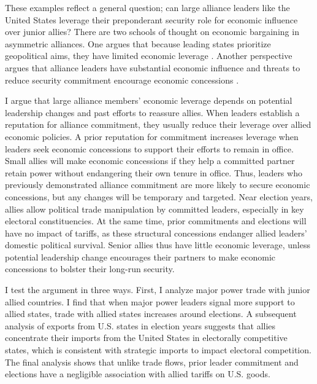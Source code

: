 \documentclass[12pt]{article}
\begin{document}
These examples reflect a general question; can large alliance leaders like the United States leverage their preponderant security role for economic influence over junior allies? 
There are two schools of thought on economic bargaining in asymmetric alliances. 
One argues that because leading states prioritize geopolitical aims, they have limited economic leverage \citep{Drezner2013, WolfordKim2017}.
Another perspective argues that alliance leaders have substantial economic influence \cite{Norrlof2010, Brooksetal2013} and threats to reduce security commitment encourage economic concessions \citep[pg. 122]{Oatley2015}. 


I argue that large alliance members' economic leverage depends on potential leadership changes and past efforts to reassure allies.
When leaders establish a reputation for alliance commitment, they usually reduce their leverage over allied economic policies. 
A prior reputation for commitment increases leverage when leaders seek economic concessions to support their efforts to remain in office. 
Small allies will make economic concessions if they help a committed partner retain power without endangering their own tenure in office.  
Thus, leaders who previously demonstrated alliance commitment are more likely to secure economic concessions, but any changes will be temporary and targeted.
Near election years, allies allow political trade manipulation by committed leaders, especially in key electoral constituencies. 
At the same time, prior commitments and elections will have no impact of tariffs, as these structural concessions endanger allied leaders' domestic political survival. 
Senior allies thus have little economic leverage, unless potential leadership change encourages their partners to make economic concessions to bolster their long-run security. 


I test the argument in three ways.
First, I analyze major power trade with junior allied countries. 
I find that when major power leaders signal more support to allied states, trade with allied states increases around elections. 
A subsequent analysis of exports from U.S. states in election years suggests that allies concentrate their imports from the United States in electorally competitive states, which is consistent with strategic imports to impact electoral competition.
The final analysis shows that unlike trade flows, prior leader commitment and elections have a negligible association with allied tariffs on U.S. goods. 
\end{document}
